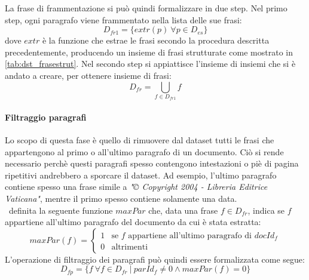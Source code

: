 La frase di frammentazione si può quindi formalizzare in due step. Nel primo step, ogni paragrafo viene frammentato nella lista delle sue frasi:
\begin{equation}
D_{fr1} = \{ extr(p)\ \forall p \in D_{es}  \}
\end{equation}
dove $extr$ è la funzione che estrae le frasi secondo la procedura descritta precedentemente, producendo un insieme di frasi strutturate come mostrato in \autoref{tab:dst_frasestrut}. Nel secondo step si appiattisce l'insieme di insiemi che si è andato a creare, per ottenere insieme di frasi:
\begin{equation}
D_{fr} = \bigcup\limits_{f \in D_{fr1}} f
\end{equation}

\paragraph{Filtraggio paragrafi}
Lo scopo di questa fase è quello di rimuovere dal dataset tutti le frasi che appartengono al primo o all'ultimo paragrafo di un documento. Ciò si rende necessario perchè questi paragrafi spesso contengono intestazioni o piè di pagina ripetitivi andrebbero a sporcare il dataset. Ad esempio, l'ultimo paragrafo contiene spesso una frase simile  a \textit{"© Copyright 2004 - Libreria Editrice Vaticana"}, mentre il primo spesso contiene solamente una data.\\
\E\ definita la seguente funzione $\textit{maxPar}$ che, data una frase $f \in D_{fr}$, indica se $f$ appartiene all'ultimo paragrafo del documento da cui è stata estratta:
\begin{equation}
  maxPar(f) =
    \begin{cases}
      1 & \text{se $f$ appartiene all'ultimo paragrafo di $docId_f$}\\
      0 & \text{altrimenti}
    \end{cases}       
\end{equation}
L'operazione di filtraggio dei paragrafi può quindi essere formalizzata come segue:
\begin{equation}
D_{fp} = \{ f \ \forall f \in D_{fr}\ |\  parId_{f} \neq 0 \wedge maxPar(f) = 0     \}
\end{equation}

